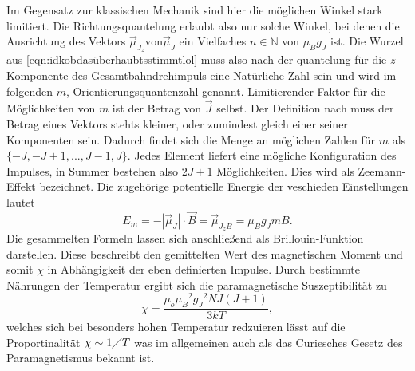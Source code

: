 Im Gegensatz zur klassischen Mechanik sind hier die möglichen Winkel stark limitiert. Die Richtungsquantelung erlaubt also nur solche Winkel, 
bei denen die Ausrichtung des Vektors $\vec{\mu}_{J_z} \text{von}  \vec{\mu}_J$ ein Vielfaches $n \in \mathbb{N} $ von $\mu_B g_J$ ist. 
Die Wurzel aus \eqref{eqn:idkobdasüberhaubtsstimmtlol} muss also nach der quantelung für die $z$-Komponente des Gesamtbahndrehimpuls
eine Natürliche Zahl sein und wird im folgenden $m$, Orientierungsquantenzahl genannt.
Limitierender Faktor für die Möglichkeiten von $m$ ist der Betrag von $\vec{J}$ selbst. Der Definition nach muss der 
Betrag eines Vektors stehts kleiner, oder zumindest gleich einer seiner Komponenten sein. Dadurch findet sich die Menge an 
möglichen Zahlen für $m$ als $\{-J,-J+1,...,J-1,J\}$. Jedes Element liefert eine mögliche Konfiguration des Impulses, in Summer 
bestehen also $2J+1$ Möglichkeiten. Dies wird als Zeemann-Effekt bezeichnet. Die zugehörige potentielle Energie der veschieden Einstellungen lautet
\begin{equation}
    E_m=-|\vec{\mu}_J|\cdot\vec{B}  = \vec{\mu}_{{J_z}B}= \mu_B g_J mB.
\end{equation}
Die gesammelten Formeln lassen sich anschließend als Brillouin-Funktion darstellen. Diese beschreibt den gemittelten Wert 
des magnetischen Moment und somit $\chi$ in Abhängigkeit der eben definierten Impulse. Durch bestimmte Nährungen der Temperatur ergibt sich
die paramagnetische Suszeptibilität zu
\begin{equation}
    \label{eqn:CHIIII}
    \chi =  \frac{\mu_o {\mu_B}^2 {g_J}^2 N J(J+1) }{3kT},
\end{equation}
welches sich bei besonders hohen Temperatur redzuieren lässt auf die Proportinalität $\chi \sim 1 \diagup T$ was im allgemeinen
auch als das Curiesches Gesetz des Paramagnetismus bekannt ist.

